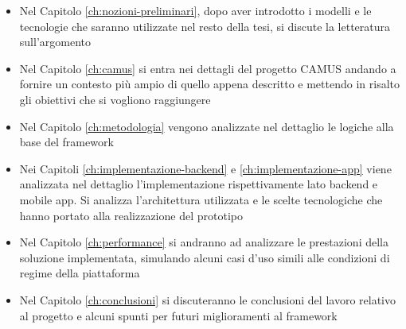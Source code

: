 \begin{itemize}
	\item 
	Nel Capitolo \ref{ch:nozioni-preliminari}, dopo aver introdotto i modelli e le tecnologie che saranno utilizzate nel resto della tesi, si discute la letteratura sull'argomento
	\item 
	Nel Capitolo \ref{ch:camus} si entra nei dettagli del progetto CAMUS andando a fornire un contesto più ampio di quello appena descritto e mettendo in risalto gli obiettivi che si vogliono raggiungere
	\item 
	Nel Capitolo \ref{ch:metodologia} vengono analizzate nel dettaglio le logiche alla base del framework
	\item 
	Nei Capitoli \ref{ch:implementazione-backend} e \ref{ch:implementazione-app} viene analizzata nel dettaglio l'implementazione rispettivamente lato backend e mobile app. Si analizza l'architettura utilizzata e le scelte tecnologiche che hanno portato alla realizzazione del prototipo
	\item 
	Nel Capitolo \ref{ch:performance} si andranno ad analizzare le prestazioni della soluzione implementata, simulando alcuni casi d'uso simili alle condizioni di regime della piattaforma
	\item 
	Nel Capitolo \ref{ch:conclusioni} si discuteranno le conclusioni del lavoro relativo al progetto e alcuni spunti per futuri miglioramenti al framework
\end{itemize}